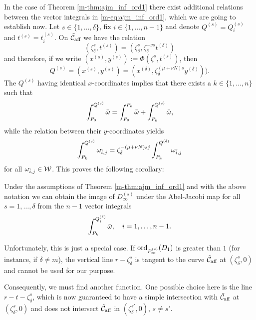 \documentclass[main.tex]{subfiles}
\begin{document}
    In the case of Theorem \ref{m-thm:ajm_inf_ord1} there exist additional relations between the vector integrals in
    \eqref{m-eq:ajm_inf_ord1}, which we are going to establish now.
    Let $s \in \{1,\dots,\delta\}$, fix $i \in \{1,\dots,n-1\}$ and denote $Q^{(s)} = Q_i^{(s)}$ and $t^{(s)} = t_i^{(s)}$.
    On $\tilde{\mathcal{C}}_{\text{aff}}$ we have the relation
     \begin{equation*}
	( \zeta_{\delta}^s,t^{(s)} ) = ( \zeta_{\delta}^s, \zeta_{\delta}^{-\nu s} t^{(\delta)} )
     \end{equation*}
     and therefore, if we write $(x^{(s)},y^{(s)}) :=  \Phi( \zeta^s,t^{(s)})$, then
     \begin{equation*}
      Q^{(s)} = (x^{(s)},y^{(s)}) = (x^{(\delta)},\zeta_{\delta}^{(\mu+\nu N)s} y^{(\delta)})).
     \end{equation*}
     The $Q^{(s)}$ having identical $x$-coordinates implies that there exists a $k \in \{1,\dots,n\}$ such that
     \begin{equation*}
      \int_{P_0}^{Q^{(s)}} \bar{\omega} =  \int_{P_0}^{P_k} \bar{\omega}  +  \int_{P_k}^{Q^{(s)}}  \bar{\omega},
     \end{equation*}
     while the relation between their $y$-coordinates yields
     \begin{equation*}
       \int_{P_k}^{Q^{(s)}} \omega_{\tilde{i},j} = \zeta_{\delta}^{-(\mu+\nu N)sj} \int_{P_k}^{Q^{(\delta)}} \omega_{\tilde{i},j}
     \end{equation*}
     for all $\omega_{\tilde{i},j} \in \mathcal{W}$. This proves the following corollary:

    \begin{coro}\label{coro:ajm_inf_ord1}
    Under the assumptions of Theorem \ref{m-thm:ajm_inf_ord1} and with the above notation we can obtain the
    image of $D_{\infty}^{(s)}$ under the Abel-Jacobi map
    for all $s = 1,\dots,\delta$ from the $n-1$ vector integrals
    \begin{equation*}
     \int_{P_k}^{Q_i^{(\delta)}} \bar{\omega}, \quad i = 1,\dots,n-1.
    \end{equation*}
    \end{coro}


    \bigskip

    Unfortunately, this is just a special case. If $\operatorname{ord}_{P_{\infty}^{(s)}}(D_1)$ is greater than $1$ (for instance, if $\delta \ne m$),
     the vertical line $r-\zeta_{\delta}^s$ is tangent to the curve $\tilde{\mathcal{C}}_{\text{aff}}$
    at $(\zeta_{\delta}^s,0)$ and cannot be used for our purpose.

    Consequently, we must find another function. One possible choice here is the line $r - t -  \zeta_{\delta}^s$, which
    is now guaranteed to have a simple intersection with $\tilde{\mathcal{C}}_{\text{aff}}$
    at $(\zeta_{\delta}^s,0)$ and does not intersect $\tilde{\mathcal{C}}_{\text{aff}}$ in $(\zeta_{\delta}^{s'},0)$, $s \ne s'$.
\end{document}
